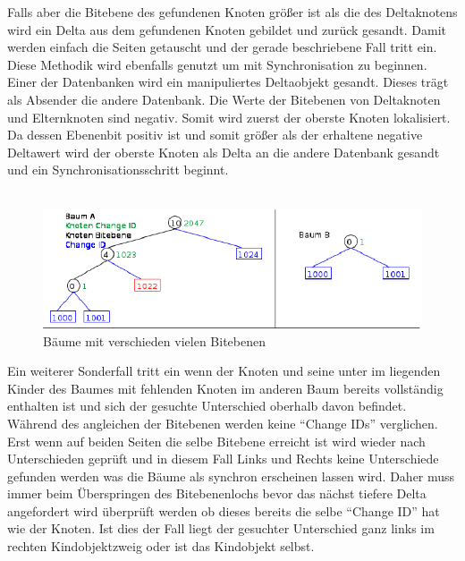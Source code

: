 \documentclass[a4paper,11pt,oneside,%
headsepline,												%
footsepline,												%
bibtotocnumbered									%
]{scrreprt}
\begin{document}
Falls aber die Bitebene des gefundenen Knoten größer ist als die des Deltaknotens wird ein Delta aus dem gefundenen Knoten gebildet und zurück gesandt. Damit werden einfach die Seiten getauscht und der gerade beschriebene Fall tritt ein. Diese Methodik wird ebenfalls genutzt um mit Synchronisation zu beginnen. Einer der Datenbanken wird ein manipuliertes Deltaobjekt gesandt. Dieses trägt als Absender die andere Datenbank. Die Werte der Bitebenen von Deltaknoten und Elternknoten sind negativ. Somit wird zuerst der oberste Knoten lokalisiert. Da dessen Ebenenbit positiv ist und somit größer als der erhaltene negative Deltawert wird der oberste Knoten als Delta an die andere Datenbank gesandt und ein Synchronisationsschritt beginnt. \\\\
\begin{figure}[h!]
  \begin{center}
    \includegraphics[width=0.9\linewidth]{bilder/case 2 A B1.png}
  \end{center}
 \caption{Bäume mit verschieden vielen Bitebenen}
\end{figure}
Ein weiterer Sonderfall tritt ein wenn der Knoten und seine unter im liegenden Kinder des Baumes mit fehlenden Knoten im anderen Baum bereits vollständig enthalten ist und sich der gesuchte Unterschied oberhalb davon befindet. Während des angleichen der Bitebenen werden keine \enquote{Change IDs} verglichen. Erst wenn auf beiden Seiten die selbe Bitebene erreicht ist wird wieder nach Unterschieden geprüft und in diesem Fall  Links und Rechts keine Unterschiede gefunden werden was die Bäume als synchron erscheinen lassen wird. Daher muss immer beim Überspringen des Bitebenenlochs bevor das nächst tiefere Delta angefordert wird überprüft werden ob dieses bereits die selbe \enquote{Change ID}  hat wie der Knoten. Ist dies der Fall liegt der gesuchter Unterschied ganz links im rechten Kindobjektzweig oder ist das Kindobjekt selbst.

\end{document}
